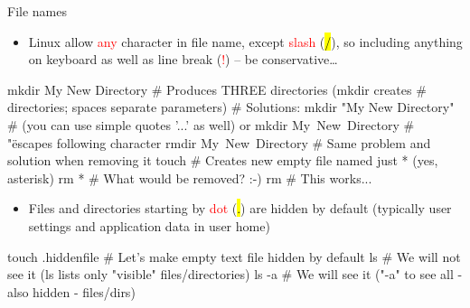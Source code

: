 \documentclass[compress, ucs, xelatex, 11pt, xcolor=svgnames,
  hyperref={
    bookmarks=true,
    unicode=true,
    colorlinks=true,
    pdftitle={Linux, command line and MetaCentrum},
    plainpages=false,
    pdfauthor={Vojtech Zeisek},
    pdfsubject={Course about use of Linux command line, writing shell scripts and using MetaCentrum of CESNET},
    pdfcreator={XeLaTeX},
    pdfkeywords={Linux, GNU, BASH, shell, command line, MetaCentrum},
    linkcolor=DarkRed,
    anchorcolor=DarkBlue,
    citecolor=Indigo,
    filecolor=NavyBlue,
    menucolor=DarkMagenta,
    urlcolor=DarkBlue,
    pdftex},
  url={hyphens, lowtilde} %
  ]{beamer}
\renewcommand{\texttt}[1]{\hl{\ttfamily #1}}
\renewcommand{\alert}[1]{\textcolor{red}{#1}}
\begin{document}
\begin{frame}[fragile]{File names}
  \begin{itemize}
    \item Linux allow \alert{any} character in file name, except \alert{slash} (\texttt{/}), so including anything on keyboard as well as line break (\alert{!}) -- be conservative\ldots
  \end{itemize}
  \begin{bashcode}
    mkdir My New Directory # Produces THREE directories (mkdir creates
                           # directories; spaces separate parameters)
                           # Solutions:
    mkdir "My New Directory" # (you can use simple quotes '...' as well) or
    mkdir My\ New\ Directory # "\" escapes following character
    rmdir My\ New\ Directory # Same problem and solution when removing it
    touch \* # Creates new empty file named just * (yes, asterisk)
    rm * # What would be removed? :-)
    rm \* # This works...
  \end{bashcode}
  \begin{itemize}
    \item Files and directories starting by \alert{dot} (\texttt{.}) are hidden by default (typically user settings and application data in user home)
  \end{itemize}
  \begin{bashcode}
    touch .hiddenfile # Let's make empty text file hidden by default
    ls # We will not see it (ls lists only "visible" files/directories)
    ls -a # We will see it ("-a" to see all - also hidden - files/dirs)
  \end{bashcode}
\end{frame}
\end{document}
